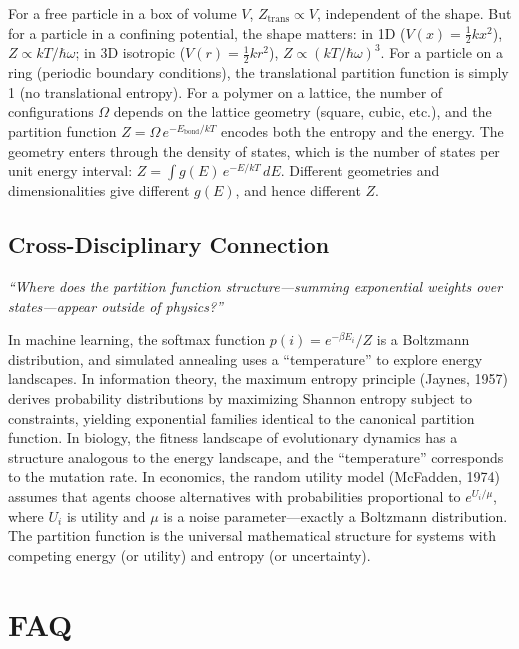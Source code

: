 \documentclass[11pt,openright]{book}
\begin{document}
For a free particle in a box of volume $V$, $Z_{\text{trans}} \propto V$, independent of the shape. But for a particle in a confining potential, the shape matters: in 1D ($V(x) = \frac{1}{2}kx^{2}$), $Z \propto kT/\hbar\omega$; in 3D isotropic ($V(r) = \frac{1}{2}kr^{2}$), $Z \propto (kT/\hbar\omega)^{3}$. For a particle on a ring (periodic boundary conditions), the translational partition function is simply 1 (no translational entropy). For a polymer on a lattice, the number of configurations $\Omega$ depends on the lattice geometry (square, cubic, etc.), and the partition function $Z = \Omega\,e^{-E_{\text{bond}}/kT}$ encodes both the entropy and the energy. The geometry enters through the density of states, which is the number of states per unit energy interval: $Z = \int g(E)\,e^{-E/kT}\,dE$. Different geometries and dimensionalities give different $g(E)$, and hence different $Z$.

\subsection*{Cross-Disciplinary Connection}
\textit{``Where does the partition function structure---summing exponential weights over states---appear outside of physics?''}

In machine learning, the softmax function $p(i) = e^{-\beta E_{i}}/Z$ is a Boltzmann distribution, and simulated annealing uses a ``temperature'' to explore energy landscapes. In information theory, the maximum entropy principle (Jaynes, 1957) derives probability distributions by maximizing Shannon entropy subject to constraints, yielding exponential families identical to the canonical partition function. In biology, the fitness landscape of evolutionary dynamics has a structure analogous to the energy landscape, and the ``temperature'' corresponds to the mutation rate. In economics, the random utility model (McFadden, 1974) assumes that agents choose alternatives with probabilities proportional to $e^{U_{i}/\mu}$, where $U_{i}$ is utility and $\mu$ is a noise parameter---exactly a Boltzmann distribution. The partition function is the universal mathematical structure for systems with competing energy (or utility) and entropy (or uncertainty).

\section*{FAQ}
\end{document}
